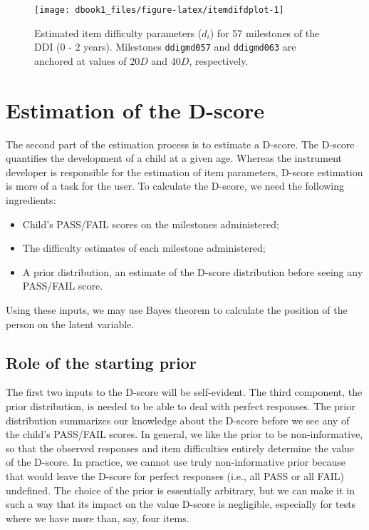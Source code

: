 \documentclass[
]{book}
\providecommand{\tightlist}{%
  \setlength{\itemsep}{0pt}\setlength{\parskip}{0pt}}
\begin{document}
\begin{figure}

{\centering \texttt{[image: dbook1\_files/figure-latex/itemdifdplot-1]} 

}

\caption{Estimated item difficulty parameters (\(d_i\)) for 57 milestones of the DDI (0 - 2 years). Milestones \texttt{ddigmd057} and \texttt{ddigmd063} are anchored at values of 20\(D\) and 40\(D\), respectively.}\label{fig:itemdifdplot}
\end{figure}



\hypertarget{sec:dscoreestimation}{%
\section{Estimation of the D-score}\label{sec:dscoreestimation}}

The second part of the estimation process is to estimate a D-score. The D-score quantifies the development of a child at a given age. Whereas the instrument developer is responsible for the estimation of item parameters, D-score estimation is more of a task for the user. To calculate the D-score, we need the following ingredients:

\begin{itemize}
\tightlist
\item
  Child's PASS/FAIL scores on the milestones administered;
\item
  The difficulty estimates of each milestone administered;
\item
  A prior distribution, an estimate of the D-score distribution before seeing any PASS/FAIL score.
\end{itemize}

Using these inputs, we may use Bayes theorem to calculate the position of the person on the latent variable.

\hypertarget{sec:startingprior}{%
\subsection{Role of the starting prior}\label{sec:startingprior}}

The first two inputs to the D-score will be self-evident. The third component, the prior distribution, is needed to be able to deal with perfect responses. The prior distribution summarizes our knowledge about the D-score before we see any of the child's PASS/FAIL scores. In general, we like the prior to be non-informative, so that the observed responses and item difficulties entirely determine the value of the D-score. In practice, we cannot use truly non-informative prior because that would leave the D-score for perfect responses (i.e., all PASS or all FAIL) undefined. The choice of the prior is essentially arbitrary, but we can make it in such a way that its impact on the value D-score is negligible, especially for tests where we have more than, say, four items.
\end{document}
